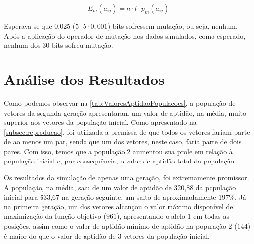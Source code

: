 \begin{equation}
	E_{m}(a_{ij}) = n \cdot l \cdot p_{m}(a_{ij})
\end{equation}

Esperava-se que 0.025 ($5 \cdot 5 \cdot 0,001$) bits sofressem mutação, ou seja, nenhum. Após a aplicação do operador de mutação nos dados simulados, como esperado, nenhum dos 30 bits sofreu mutação.

\section{Análise dos Resultados}

Como podemos observar na \autoref{tab:ValoresAptidaoPopulacoes}, a população de vetores da segunda geração apresentaram um valor de aptidão, na média, muito superior aos vetores da população inicial. Como apresentado na \autoref{subsec:reproducao}, foi utilizada a premissa de que todos os vetores fariam parte de ao menos um par, sendo que um dos vetores, neste caso, faria parte de dois pares. Com isso, temos que a população 2 aumentou sua prole em relação à população inicial e, por consequência, o valor de aptidão total da população.

Os resultados da simulação de apenas uma geração, foi extremamente promissor. A população, na média, saiu de um valor de aptidão de 320,88 da população inicial para 633,67 na geração seguinte, um salto de aproximadamente 197\%. Já na primeira geração, um dos vetores alcançou o valor máximo disponível de maximização da função objetivo ($961$), apresentando o alelo $1$ em todas as posições, assim como o valor de aptidão mínimo de aptidão na população 2 ($144$) é maior do que o valor de aptidão de 3 vetores da população inicial. 

